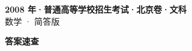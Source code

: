 \documentclass[zihao=-4, a4paper]{ctexart}
\begin{document}
\begin{center}
  {\Large\bfseries 2008 年·普通高等学校招生考试·北京卷·文科}\\[4pt]
  {\large 数学 · 简答版}
\end{center}
\medskip
{}

\clearpage
{}
\begin{center}{\Large\bfseries 答案速查}\end{center}
\medskip

\end{document}
